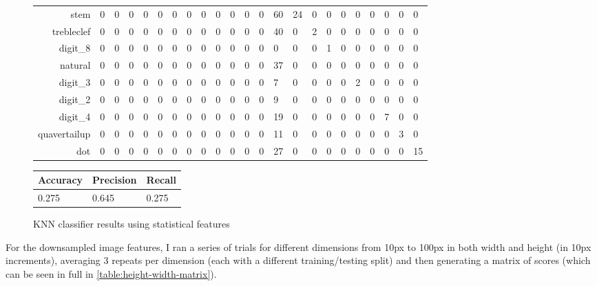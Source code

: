 \begin{figure}
\begin{subtable}[b]{\linewidth}
\begin{tabularx}{\textwidth}{r|XXXXXXXXXXXXXXXXXXXXXX}
    stem & 0 & 0 & 0 & 0 & 0 & 0 & 0 & 0 & 0 & 0 & 0 & 0 & 60 & 24 & 0 & 0 & 0 & 0 & 0 & 0 & 0 & 0 \\
    trebleclef & 0 & 0 & 0 & 0 & 0 & 0 & 0 & 0 & 0 & 0 & 0 & 0 & 40 & 0 & 2 & 0 & 0 & 0 & 0 & 0 & 0 & 0 \\
    digit\_8 & 0 & 0 & 0 & 0 & 0 & 0 & 0 & 0 & 0 & 0 & 0 & 0 & 0 & 0 & 0 & 1 & 0 & 0 & 0 & 0 & 0 & 0 \\
    natural & 0 & 0 & 0 & 0 & 0 & 0 & 0 & 0 & 0 & 0 & 0 & 0 & 37 & 0 & 0 & 0 & 0 & 0 & 0 & 0 & 0 & 0 \\
    digit\_3 & 0 & 0 & 0 & 0 & 0 & 0 & 0 & 0 & 0 & 0 & 0 & 0 & 7 & 0 & 0 & 0 & 0 & 2 & 0 & 0 & 0 & 0 \\
    digit\_2 & 0 & 0 & 0 & 0 & 0 & 0 & 0 & 0 & 0 & 0 & 0 & 0 & 9 & 0 & 0 & 0 & 0 & 0 & 0 & 0 & 0 & 0 \\
    digit\_4 & 0 & 0 & 0 & 0 & 0 & 0 & 0 & 0 & 0 & 0 & 0 & 0 & 19 & 0 & 0 & 0 & 0 & 0 & 0 & 7 & 0 & 0 \\
    quavertailup & 0 & 0 & 0 & 0 & 0 & 0 & 0 & 0 & 0 & 0 & 0 & 0 & 11 & 0 & 0 & 0 & 0 & 0 & 0 & 0 & 3 & 0 \\
    dot & 0 & 0 & 0 & 0 & 0 & 0 & 0 & 0 & 0 & 0 & 0 & 0 & 27 & 0 & 0 & 0 & 0 & 0 & 0 & 0 & 0 & 15 \\
    \end{tabularx}
  \end{subtable}

  \vspace{0.8cm}

  \begin{subtable}[b]{.4\linewidth}
    \begin{tabularx}{\linewidth}{lll}
      \toprule
      Accuracy & Precision & Recall \\
      \midrule
      0.275 & 0.645 & 0.275 \\
      \bottomrule
    \end{tabularx}
  \end{subtable}
  
  \caption{KNN classifier results using statistical features}
  \label{fig:knn-stats}
\end{figure}

For the downsampled image features, I ran a series of trials for different dimensions from 10px to 100px in both width and height (in 10px increments), averaging 3 repeats per dimension (each with a different training/testing split) and then generating a matrix of scores (which can be seen in full in \cref{table:height-width-matrix}).

